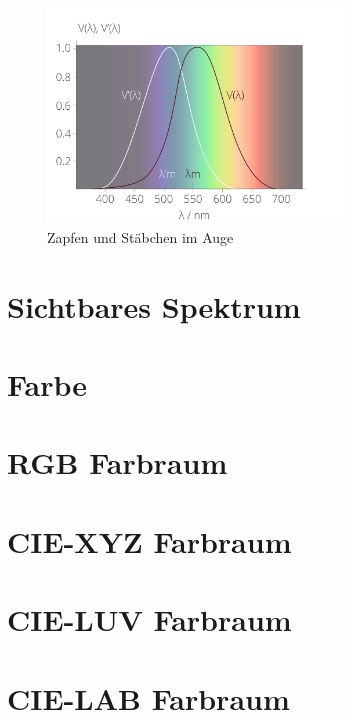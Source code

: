 \begin{figure}[htp]     %
\centering
\includegraphics[width=0.7\textwidth]{bilder/augespek} 
\caption {Zapfen und Stäbchen im Auge\protect\footnotemark}\label{b_augespek}
\end{figure}



\section{Sichtbares Spektrum} \label{sec_spektrum}

\section{Farbe} \label{sec_farbe}

\section{RGB Farbraum} \label{sec_rgb}

\section{CIE-XYZ Farbraum} \label{sec_xyz}

\section{CIE-LUV Farbraum} \label{sec_luv}

\section{CIE-LAB Farbraum} \label{sec_lab}

